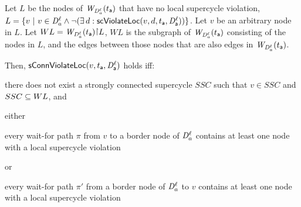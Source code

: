\label{def:sConn.violation.loc}

Let $L$ be the nodes of $\mathit{W}_{\mathit{D}_{a}^{\ell}}({t_{\mathsf{a}}})$ that have no local
supercycle violation, \ie $L = \{ v ~|~ v \in \mathit{D}_{a}^{\ell} \land \neg (\exists\, d: \mathsf{scViolateLoc}(v,d,t_{\mathsf{a}},\mathit{D}_{\mathsf{a}}^{\ell}))  \}$.
Let $v$ be an arbitrary node in $L$. 
Let $WL = \wfg{\dsk{a}{\l}}{t_\act} \pj L$, \ie $WL$ is the subgraph of $\mathit{W}_{\mathit{D}_{a}^{\ell}}({t_{\mathsf{a}}})$ consisting of the
nodes in $L$, and the edges between those nodes that are also edges in $\mathit{W}_{\mathit{D}_{a}^{\ell}}({t_{\mathsf{a}}})$.

Then, $\mathsf{sConnViolateLoc}(v,t_{\mathsf{a}},\mathit{D}_{\mathsf{a}}^{\ell})$ holds iff:
\bn

\item \label{def:sConn.violation.loc:scc}
there does not exist a strongly connected supercycle $SSC$ such that $v \in SSC$ and $SSC \subseteq WL$, and


\item \label{def:sConn.violation.border}
either
    \bn

    \item \label{def:sConn.violation.loc:wait-for-out} every wait-for path $\pi$ from $v$ to a border node
      of $\mathit{D}_{a}^{\ell}$ contains at least one node with a local supercycle violation

     or

    \item \label{def:sConn.violation.loc:wait-for-in} every wait-for path $\pi'$ from a border node
      of $\mathit{D}_{a}^{\ell}$ to $v$ contains at least one node with a local supercycle violation

    \en

\en
\ed



